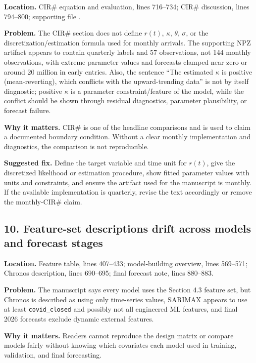 \documentclass[11pt]{article}
\begin{document}
\textbf{Location.} CIR\# equation and evaluation, lines 716--734; CIR\# discussion, lines 794--800; supporting file .

\textbf{Problem.} The CIR\# section does not define \(r(t)\), \(\kappa\), \(\theta\), \(\sigma\), or the discretization/estimation formula used for monthly arrivals. The supporting NPZ artifact appears to contain quarterly labels and 57 observations, not 144 monthly observations, with extreme parameter values and forecasts clamped near zero or around \(20\) million in early entries. Also, the sentence ``The estimated \(\kappa\) is positive (mean-reverting), which conflicts with the upward-trending data'' is not by itself diagnostic; positive \(\kappa\) is a parameter constraint/feature of the model, while the conflict should be shown through residual diagnostics, parameter plausibility, or forecast failure.

\textbf{Why it matters.} CIR\# is one of the headline comparisons and is used to claim a documented boundary condition. Without a clear monthly implementation and diagnostics, the comparison is not reproducible.

\textbf{Suggested fix.} Define the target variable and time unit for \(r(t)\), give the discretized likelihood or estimation procedure, show fitted parameter values with units and constraints, and ensure the artifact used for the manuscript is monthly. If the available implementation is quarterly, revise the text accordingly or remove the monthly-CIR\# claim.

\subsection*{10. Feature-set descriptions drift across models and forecast stages}

\textbf{Location.} Feature table, lines 407--433; model-building overview, lines 569--571; Chronos description, lines 690--695; final forecast note, lines 880--883.

\textbf{Problem.} The manuscript says every model uses the Section 4.3 feature set, but Chronos is described as using only time-series values, SARIMAX appears to use at least \texttt{covid\_closed} and possibly not all engineered ML features, and final 2026 forecasts exclude dynamic external features.

\textbf{Why it matters.} Readers cannot reproduce the design matrix or compare models fairly without knowing which covariates each model used in training, validation, and final forecasting.
\end{document}
